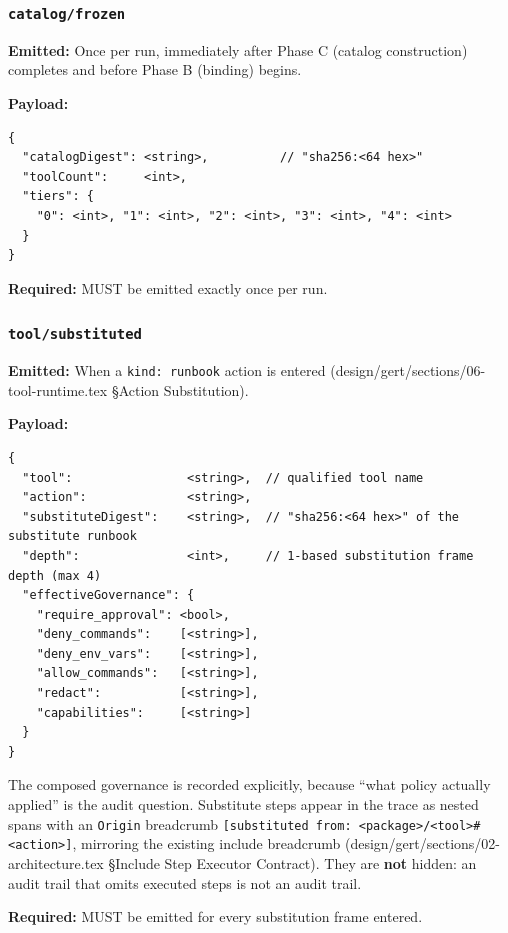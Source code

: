 \subsubsection{\texttt{catalog/frozen}}

\textbf{Emitted:} Once per run, immediately after Phase C (catalog
construction) completes and before Phase B (binding) begins.

\textbf{Payload:}
\begin{verbatim}
{
  "catalogDigest": <string>,          // "sha256:<64 hex>"
  "toolCount":     <int>,
  "tiers": {
    "0": <int>, "1": <int>, "2": <int>, "3": <int>, "4": <int>
  }
}
\end{verbatim}

\textbf{Required:} MUST be emitted exactly once per run.


\subsubsection{\texttt{tool/substituted}}

\textbf{Emitted:} When a \texttt{kind: runbook} action is entered
(design/gert/sections/06-tool-runtime.tex §Action Substitution).

\textbf{Payload:}
\begin{verbatim}
{
  "tool":                <string>,  // qualified tool name
  "action":              <string>,
  "substituteDigest":    <string>,  // "sha256:<64 hex>" of the substitute runbook
  "depth":               <int>,     // 1-based substitution frame depth (max 4)
  "effectiveGovernance": {
    "require_approval": <bool>,
    "deny_commands":    [<string>],
    "deny_env_vars":    [<string>],
    "allow_commands":   [<string>],
    "redact":           [<string>],
    "capabilities":     [<string>]
  }
}
\end{verbatim}

The composed governance is recorded explicitly, because ``what policy
actually applied'' is the audit question. Substitute steps appear in the
trace as nested spans with an \texttt{Origin} breadcrumb
\texttt{[substituted from: <package>/<tool>\#<action>]}, mirroring the
existing include breadcrumb (design/gert/sections/02-architecture.tex
§Include Step Executor Contract). They are \textbf{not} hidden: an audit
trail that omits executed steps is not an audit trail.

\textbf{Required:} MUST be emitted for every substitution frame entered.

